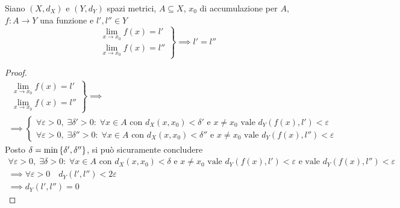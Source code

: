 \begin{theorem}
	Siano $(X,d_X)$ e $(Y,d_Y)$ spazi metrici, $A \subseteq X$, $x_0$ di accumulazione per $A$, $f: A \to Y$ una funzione e $l', l'' \in Y$
	\begin{equation*}
		\left.
		\begin{array}{c}
			\lim\limits_{x \to x_0} f(x) = l'\\
			\lim\limits_{x \to x_0} f(x) = l''
		\end{array}
		\right\}
		\implies l' = l''
	\end{equation*}
	\begin{proof}
		\begin{equation*}
			\begin{gathered}
				\left.
				\begin{array}{c}
					\lim\limits_{x \to x_0} f(x) = l'\\
					\lim\limits_{x \to x_0} f(x) = l''
				\end{array}
				\right\} \implies\\
				\implies
				\begin{cases}
					\forall \varepsilon > 0,\; \exists \delta' > 0:\; \forall x \in A \text{ con } d_X(x,x_0) < \delta' \text{ e } x \neq x_0 \text{ vale } d_Y(f(x),l')<\varepsilon\\
					\forall \varepsilon > 0,\; \exists \delta'' > 0:\; \forall x \in A \text{ con } d_X(x,x_0) < \delta'' \text{ e } x \neq x_0 \text{ vale } d_Y(f(x),l'')<\varepsilon
				\end{cases}
			\end{gathered}
		\end{equation*}
		Posto $\delta = \min \left\{\delta', \delta''\right\}$, si può sicuramente concludere
		\begin{equation*}
			\begin{gathered}
				\forall \varepsilon > 0,\; \exists \delta > 0:\; \forall x \in A \text{ con } d_X(x,x_0) < \delta \text{ e } x \neq x_0 \text{ vale } d_Y(f(x),l')<\varepsilon \text{ e vale } d_Y(f(x),l'') <\varepsilon\\
				\implies \forall \varepsilon > 0 \quad d_Y(l', l'') < 2 \varepsilon\\
				\implies d_Y(l', l'') = 0
			\end{gathered}
		\end{equation*}
	\end{proof}
\end{theorem}

